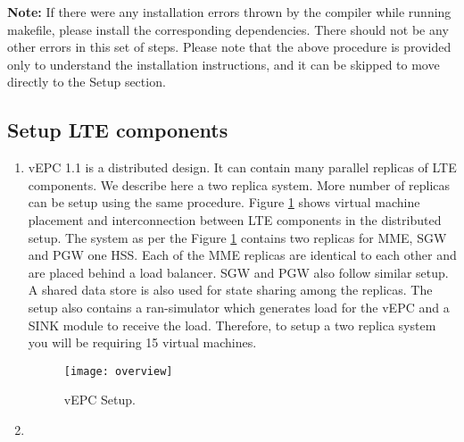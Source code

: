 \pdfminorversion=4\documentclass[hidelinks]{report}
\begin{document}
\textbf{Note:} If there were any installation errors thrown by the compiler while running makefile, please install the corresponding dependencies. There should not be any other errors in this set of steps. Please note that the above procedure is provided only to understand the installation instructions, and it can be skipped to move directly to the Setup section.

\subsection*{Setup LTE components}

\begin{enumerate}


\item vEPC 1.1 is a distributed design. It can contain many parallel replicas of LTE components. We describe here a two replica system. More number of replicas can be setup using the same procedure. Figure \ref{setup} shows virtual machine placement and interconnection between LTE components in the distributed setup. The system as per the Figure \ref{setup} contains two replicas for MME, SGW and PGW one HSS. Each of the MME replicas are identical to each other and are placed behind a load balancer. SGW and PGW also follow similar setup. A shared data store is also used for state sharing among the replicas. The setup also contains a ran-simulator which generates load for the vEPC and a SINK module to receive the load. Therefore, to setup a two replica system you will be requiring 15 virtual machines.  
\begin{figure}[H]

\centering
\texttt{[image: overview]}
\caption{vEPC Setup.}
\label{setup}

\end{figure}

\item


\end{enumerate}
\end{document}

